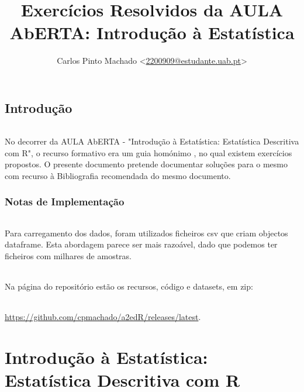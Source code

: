 \documentclass[11pt,a4paper]{report}
\author{Carlos Pinto Machado
	<\href{mailto:2200909@estudante.uab.pt}{2200909@estudante.uab.pt}>}
\title{Exercícios Resolvidos da AULA AbERTA: Introdução à Estatística}
\begin{document}
\maketitle
\tableofcontents

\clearpage

\chapter*{Introdução}

\paragraph{} No decorrer da AULA AbERTA - "Introdução à Estatística:
Estatística Descritiva com R"\cite{AulaAbertaIntroducaoEstatistica2017}, o
recurso formativo era um guia homónimo
\cite{OliveiraAulaAberta2017}, no qual existem
exercícios propostos. O presente documento pretende documentar soluções para o
mesmo com recurso à Bibliografia recomendada do mesmo
documento\cite{OliveiraEstatisticaDescritiva2011}.

\section*{Notas de Implementação}

\paragraph{} Para carregamento dos dados, foram utilizados ficheiros csv que
criam objectos dataframe. Esta abordagem parece ser mais razoável, dado que
podemos ter ficheiros com milhares de amostras.

\paragraph{} Na página do repositório\cite{a2edRRepo}
estão os recursos, código e datasets, em zip:

\paragraph{}\url{https://github.com/cpmachado/a2edR/releases/latest}.


\part{Introdução à Estatística: Estatística Descritiva com R}
\end{document}
